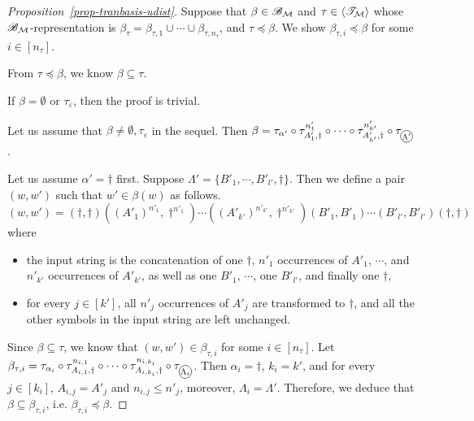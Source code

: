 \begin{proof}[Proposition~\ref{prop-tranbasis-udist}]

Suppose that $\beta \in {\mathscr{B} }_{\mathcal{M} }$ and $\tau \in \langle {\mathscr{T} }_{\mathcal{M} } \rangle$ whose ${\mathscr{B} }_{\mathcal{M} }$-representation is $\beta_\tau=\beta_{\tau, 1} \cup \cdots \cup \beta_{\tau, n_\tau}$, and $\tau \preceq \beta$. We show $ \beta_{\tau, i} \preceq \beta$ for some $i \in [n_\tau]$.


From $\tau \preceq \beta$, we know $\beta \subseteq \tau$.

If $\beta = \emptyset$ or $\tau_\varepsilon$, then the proof is trivial. 

Let us assume that $\beta \neq \emptyset, \tau_\varepsilon$ in the sequel.
Then $\beta = \tau_{\alpha'} \circ \tau^{n'_{1}}_{A'_{1}, \dag} \circ \cdots \circ  \tau^{n'_{k'}}_{A'_{ k'}, \dag} \circ \tau_{\mathcircled{\Lambda'}}$.

Let us assume $\alpha' = \dag$ first. Suppose $\Lambda' = \{B'_{1}, \cdots, B'_{ l'}, \dag\}$.  Then we define a pair $(w, w')$ such that $w' \in \beta(w)$ as follows. 
%
$$(w, w') = (\dag, \dag) ((A'_{1})^{n'_{1}}, \dag^{n'_{1}}) \cdots ((A'_{k'})^{n'_{k'}}, \dag^{n'_{k'}}) (B'_{1}, B'_{1}) \cdots (B'_{l'}, B'_{l'}) (\dag, \dag)$$ 
%
where 
\begin{itemize}
\item the input string is the concatenation of one $\dag$, $n'_{1}$ occurrences of $A'_{1}$, $\cdots$, and $n'_{k'}$ occurrences of $A'_{k'}$, as well as one $B'_1$, $\cdots$, one $B'_{l'}$, and finally one $\dag$, 
%
\item for every $j \in [k']$,  all $n'_{j}$ occurrences of $A'_{j}$ are transformed to $\dag$, and all the other symbols in the input string are left unchanged.
\end{itemize}
Since $\beta \subseteq \tau$, we know that $(w, w') \in \beta_{\tau, i}$ for some $i \in [n_\tau]$. 
Let $ \beta_{\tau, i} = \tau_{\alpha_i} \circ \tau^{n_{i,1}}_{A_{i,1}, \dag} \circ \cdots \circ  \tau^{n_{i, k_i}}_{A_{i,k_i}, \dag} \circ \tau_{\mathcircled{\Lambda_i}}$.
Then $\alpha_i = \dag$, $k_i = k'$, and for every $j \in [k_i]$, $A_{i, j} = A'_{j}$ and $n_{i, j} \le n'_{ j}$, moreover, $\Lambda_i = \Lambda'$.
Therefore, we deduce that $\beta \subseteq  \beta_{\tau, i}$, i.e. $\beta_{\tau, i} \preceq \beta$.


\end{proof}
